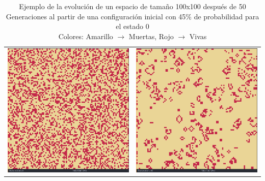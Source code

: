 \documentclass[]{article}
\begin{document}
		\begin{landscape}
			
			\hfill \break
			\hfill \break
			\hfill \break
			\hfill \break
			\hfill \break
			\hfill \break
			\hfill \break
			\begin{table}[!h]
				\centering
				\begin{tabular}{c c}
					\includegraphics[width=11cm]{Imagenes/Evolucion_100x100_0Gen.png} &
					\includegraphics[width=11cm]{Imagenes/Evolucion_100x100_50Gen.png}
				\end{tabular}
				\caption{Ejemplo de la evolución de un espacio de tamaño 100x100 después de 50 Generaciones al partir de una configuración inicial con 45\% de probabilidad para el estado 0 \\ Colores: Amarillo $\rightarrow$ Muertas, Rojo $\rightarrow$ Vivas}
				\label{Evolucion_100x100}
			\end{table}
			

\end{landscape}
\end{document}
